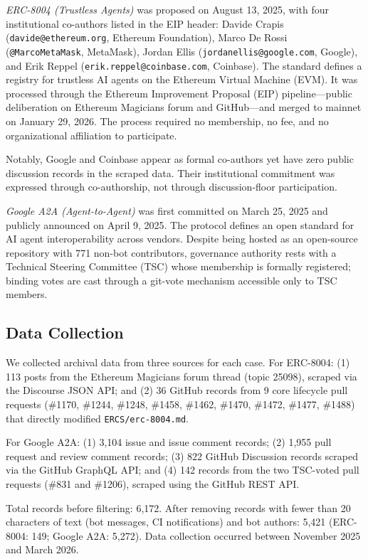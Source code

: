 \documentclass[conference]{IEEEtran}
\begin{document}
\textit{ERC-8004 (Trustless Agents)} was proposed on August 13, 2025, with
four institutional co-authors listed in the EIP header: Davide Crapis
(\texttt{davide@ethereum.org}, Ethereum Foundation), Marco De Rossi
(\texttt{@MarcoMetaMask}, MetaMask), Jordan Ellis
(\texttt{jordanellis@google.com}, Google), and Erik Reppel
(\texttt{erik.reppel@coinbase.com}, Coinbase). The standard defines a
registry for trustless AI agents on the Ethereum Virtual Machine (EVM).
It was processed through the Ethereum Improvement Proposal (EIP)
pipeline---public deliberation on Ethereum Magicians forum and GitHub---and
merged to mainnet on January 29, 2026. The process required no membership,
no fee, and no organizational affiliation to participate.

Notably, Google and Coinbase appear as formal co-authors yet have zero
public discussion records in the scraped data. Their institutional commitment
was expressed through co-authorship, not through discussion-floor participation.

\textit{Google A2A (Agent-to-Agent)} was first committed on March 25, 2025
and publicly announced on April 9, 2025. The protocol defines an open
standard for AI agent interoperability across vendors. Despite being hosted
as an open-source repository with 771 non-bot contributors, governance authority
rests with a Technical Steering Committee (TSC) whose membership is formally
registered; binding votes are cast through a git-vote mechanism accessible
only to TSC members.

\subsection{Data Collection}

We collected archival data from three sources for each case. For ERC-8004:
(1) 113 posts from the Ethereum Magicians forum thread (topic 25098), scraped
via the Discourse JSON API; and (2) 36 GitHub records from 9 core lifecycle
pull requests (\#1170, \#1244, \#1248, \#1458, \#1462, \#1470, \#1472,
\#1477, \#1488) that directly modified \texttt{ERCS/erc-8004.md}.

For Google A2A: (1) 3,104 issue and issue comment records; (2) 1,955 pull
request and review comment records; (3) 822 GitHub Discussion records scraped
via the GitHub GraphQL API; and (4) 142 records from the two TSC-voted pull
requests (\#831 and \#1206), scraped using the GitHub REST API.

Total records before filtering: 6,172. After removing records with fewer than
20 characters of text (bot messages, CI notifications) and bot authors: 5,421
(ERC-8004: 149; Google A2A: 5,272).
Data collection occurred between November 2025 and March 2026.
\end{document}
